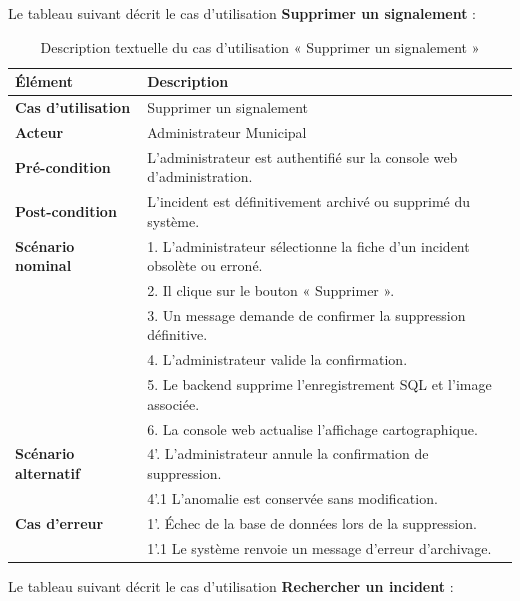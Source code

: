 Le tableau suivant décrit le cas d'utilisation \textbf{\og Supprimer un signalement \fg{}} :

\begin{table}[H]
    \centering
    \caption{Description textuelle du cas d'utilisation « Supprimer un signalement »}
    \label{tab:txt_suppr_offre}
    \vspace{0.2cm}
    \small
    \begin{tabularx}{\textwidth}{|l|X|}
        \hline
        \textbf{Élément} & \textbf{Description} \\ \hline
        \textbf{Cas d’utilisation} & Supprimer un signalement \\ \hline
        \textbf{Acteur} & Administrateur Municipal \\ \hline
        \textbf{Pré-condition} & L'administrateur est authentifié sur la console web d'administration. \\ \hline
        \textbf{Post-condition} & L'incident est définitivement archivé ou supprimé du système. \\ \hline
        \textbf{Scénario nominal} &
        1. L'administrateur sélectionne la fiche d'un incident obsolète ou erroné.\\
        & 2. Il clique sur le bouton « Supprimer ».\\
        & 3. Un message demande de confirmer la suppression définitive.\\
        & 4. L'administrateur valide la confirmation.\\
        & 5. Le backend supprime l'enregistrement SQL et l'image associée.\\
        & 6. La console web actualise l'affichage cartographique. \\ \hline
        \textbf{Scénario alternatif} &
        4'. L'administrateur annule la confirmation de suppression.\\
        & 4'.1 L'anomalie est conservée sans modification. \\ \hline
        \textbf{Cas d’erreur} &
        1'. Échec de la base de données lors de la suppression.\\
        & 1'.1 Le système renvoie un message d'erreur d'archivage. \\ \hline
    \end{tabularx}
\end{table}

Le tableau suivant décrit le cas d'utilisation \textbf{\og Rechercher un incident \fg{}} :

